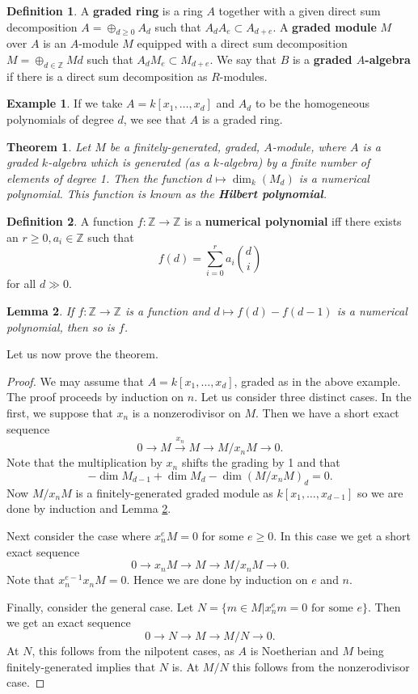 \documentclass{article}
\newcommand{\Z}{\mathbb{Z}}
\DeclareMathOperator{\trdeg}{trdeg}
\theoremstyle{plain}
\newtheorem{thm}{Theorem}
\newtheorem{lem}[thm]{Lemma}
\theoremstyle{definition}
\newtheorem{defn}{Definition}
\newtheorem{exmp}{Example}
\theoremstyle{remark}
\begin{document}
\begin{defn}
A \textbf{graded ring} is a ring $A$ together with a given direct sum decomposition $A=\oplus_{d\geq 0}A_d$ such that $A_dA_e\subset A_{d+e}$. A \textbf{graded module} $M$
over $A$ is an $A$-module $M$ equipped with a direct sum decomposition $M=\oplus_{d\in\Z}Md$ such that $A_dM_e\subset M_{d+e}$. We say that $B$ is a \textbf{graded $A$-algebra} if there is a direct sum decomposition as $R$-modules.
\end{defn}

\begin{exmp}
If we take $A=k[x_1,\ldots,x_d]$ and $A_d$ to be the homogeneous polynomials of degree $d$, we see that $A$ is a graded ring.
\end{exmp}

\begin{thm}
\label{L65}
Let $M$ be a finitely-generated, graded, $A$-module, where $A$ is a graded $k$-algebra which is generated (as a $k$-algebra) by a finite number of elements of degree \todo{$\trdeg$?} 1. Then the function $d\mapsto \dim_k(M_d)$ is a numerical polynomial. This function is known as the \textbf{Hilbert polynomial}.
\end{thm}

\begin{defn}
A function $f:\Z\to\Z$ is a \textbf{numerical polynomial} iff there exists an $r\geq 0,a_i\in \Z$ such that
\[f(d)=\sum_{i=0}^r a_i\binom{d}{i}\]
for all $d\gg 0$.
\end{defn}

\begin{lem}
\label{L66}
If $f:\Z\to\Z$ is a function and $d\mapsto f(d)-f(d-1)$ is a numerical polynomial, then so is $f$.
\end{lem}

Let us now prove the theorem.

\begin{proof}
We may assume that $A=k[x_1,\ldots, x_d]$, graded as in the above example. The proof proceeds by induction on $n$. Let us consider three distinct cases. In the first, we suppose that $x_n$ is a nonzerodivisor on $M$. Then we have a short exact sequence
\[0\to M\overset{x_n}{\to}M\to M/x_nM\to 0.\]
Note that the multiplication by $x_n$ shifts the grading by 1 and that
\[-\dim M_{d-1}+\dim M_d-\dim \left( M/x_nM\right)_d=0.\]
Now $M/x_nM$ is a finitely-generated graded module  as $k[x_1,\ldots,x_{d-1}]$ so we are done by induction and Lemma \ref{L66}.

Next consider the case where $x_n^eM=0$ for some $e\geq 0$. In this case we get a short exact sequence
\[0\to x_nM\to M\to M/x_nM\to 0.\]
Note that $x_n^{e-1}x_nM=0$. Hence we are done by induction on $e$ and $n$.

Finally, consider the general case. Let $N=\{m\in M | x_n^e m=0\text{ for some }e\}$. Then
we get an exact sequence
\[0\to N\to M\to M/N\to 0.\]
At $N$, this follows from the nilpotent cases, as $A$ is Noetherian and $M$ being finitely-generated implies that $N$ is. At $M/N$ this follows from the nonzerodivisor case.
\end{proof}
\end{document}

